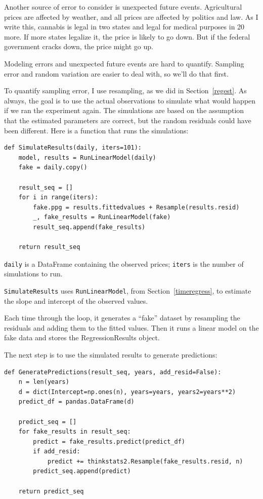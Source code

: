\documentclass[12pt]{book}
\theoremstyle{exercise}
\begin{document}
Another source of error to consider is unexpected future events.
Agricultural prices are affected by weather, and all prices are
affected by politics and law.  As I write this, cannabis is legal in
two states and legal for medical purposes in 20 more.  If more states
legalize it, the price is likely to go down.  But if
the federal government cracks down, the price might go up.

Modeling errors and unexpected future events are hard to quantify.
Sampling error and random variation are easier to deal with, so we'll
do that first.

To quantify sampling error, I use resampling, as we did in
Section~\ref{regest}.  As always, the goal is to use the actual
observations to simulate what would happen if we ran the experiment
again.  The simulations are based on the assumption that the estimated
parameters are correct, but the random residuals could have been
different.  Here is a function that runs the simulations:%

\begin{verbatim}
def SimulateResults(daily, iters=101):
    model, results = RunLinearModel(daily)
    fake = daily.copy()
    
    result_seq = []
    for i in range(iters):
        fake.ppg = results.fittedvalues + Resample(results.resid)
        _, fake_results = RunLinearModel(fake)
        result_seq.append(fake_results)

    return result_seq
\end{verbatim}

{\tt daily} is a DataFrame containing the observed prices;
{\tt iters} is the number of simulations to run.%
%

{\tt SimulateResults} uses {\tt RunLinearModel}, from
Section~\ref{timeregress}, to estimate the slope and intercept
of the observed values.

Each time through the loop, it generates a ``fake'' dataset by
resampling the residuals and adding them to the fitted values.  Then
it runs a linear model on the fake data and stores the RegressionResults
object.%
%

The next step is to use the simulated results to generate predictions:

\begin{verbatim}
def GeneratePredictions(result_seq, years, add_resid=False):
    n = len(years)
    d = dict(Intercept=np.ones(n), years=years, years2=years**2)
    predict_df = pandas.DataFrame(d)
    
    predict_seq = []
    for fake_results in result_seq:
        predict = fake_results.predict(predict_df)
        if add_resid:
            predict += thinkstats2.Resample(fake_results.resid, n)
        predict_seq.append(predict)

    return predict_seq
\end{verbatim}
\end{document}
